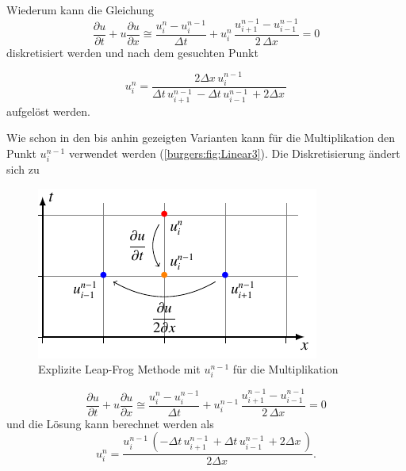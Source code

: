 	Wiederum kann die Gleichung
	\begin{equation}
	\frac {\partial u}{\partial t}+u{\frac {\partial u}{\partial x}} \cong \frac{u_{i}^{n}-u_{i}^{n-1}}{\Delta t}+ u_{i}^{n}\, \frac{u_{i+1}^{n-1}-u_{i-1}^{n-1}}{2\,\Delta x}=0
	\end{equation}
	diskretisiert werden und nach dem gesuchten Punkt


	\begin{equation}
	u_{i}^{n} = \frac{2 \Delta{x}\, u^{n-1}_{i}\,}{\Delta{t}\, u^{n-1}_{i+1}\, - \Delta{t}\, u^{n-1}_{i-1}\, + 2 \Delta{x}\,}
	\end{equation}
 aufgel\"ost werden.

\medskip

	Wie schon in den bis anhin gezeigten Varianten kann f\"ur die Multiplikation den Punkt $u_{i}^{n-1}$ verwendet werden (\autoref{burgers:fig:Linear3}).
	Die Diskretisierung \"andert sich zu

	\begin{figure}
	\centering
	\includegraphics[height=.4\textwidth]{papers/burgers/BurgersEquation/tikz/linear3/linear3.pdf}
	\caption{Explizite Leap-Frog Methode mit  $u_{i}^{n-1}$ f\"ur die Multiplikation}
	\label{burgers:fig:Linear3}
	\end{figure}



	\begin{equation}
		\frac {\partial u}{\partial t}+u{\frac {\partial u}{\partial x}} \cong \frac{u_{i}^{n}-u_{i}^{n-1}}{\Delta t}+ u_{i}^{n-1}\, \frac{u_{i+1}^{n-1}-u_{i-1}^{n-1}}{2\,\Delta x}=0
		\label{burgers:eq_ex_lf1}
	\end{equation}
 	und die L\"osung kann berechnet werden als
	\begin{equation}
	 u_{i}^{n} = \frac{u^{n-1}_{i}\, \left(- \Delta{t}\, u^{n-1}_{i+1}\, + \Delta{t}\, u^{n-1}_{i-1}\, + 2 \Delta{x}\,\right)}{2 \Delta{x}\,}.
		\label{burgers:eq_ex_sol_lf1}
	\end{equation}



